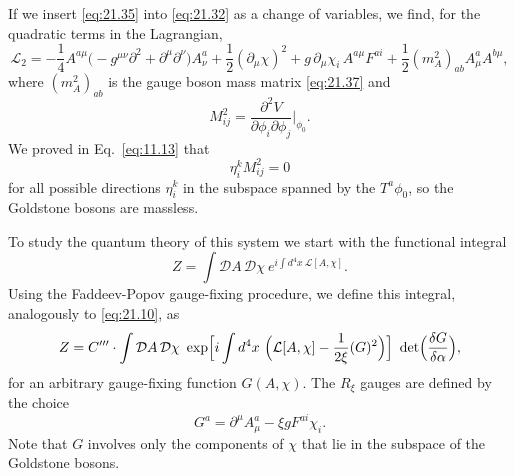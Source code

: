 If we insert \eqref{eq:21.35} into \eqref{eq:21.32} as a change of
variables, we find, for the quadratic terms in the Lagrangian,
\begin{equation}
  \mathcal{L}_2 = -\frac{1}{4}A^{a\mu}\bigl( -g^{\mu\nu}\partial^2
    + \partial^\mu\partial^\nu \bigr)A^a_\nu + \frac{1}{2}(\partial_\mu\chi)^2
    + g\,\partial_\mu\chi_i\,A^{a\mu}F^{ai}
    + \frac{1}{2}(m^2_A)_{ab}A^a_\mu A^{b\mu} ,
  \label{eq:21.40}
\end{equation}
where $(m^2_A)_{ab}$ is the gauge boson mass matrix \eqref{eq:21.37} and
\begin{equation}
  M^2_{ij} = \frac{\partial^2V}{\partial\phi_i\partial\phi_j}
    \Big|_{\phi_0} .
  \label{eq:21.41}
\end{equation}
We proved in Eq.~\eqref{eq:11.13} that
\begin{equation}
  \eta_i^k M^2_{ij} = 0
  \label{eq:21.42}
\end{equation}
for all possible directions $\eta_i^k$ in the subspace spanned by the
$T^a\phi_0$, so the Goldstone bosons are massless.

To study the quantum theory of this system we start with the functional
integral
\begin{equation}
  Z = \int \mathcal{D}A\,\mathcal{D}\chi\ e^{i\int d^4x\ \mathcal{L}[A,\chi]} .
  \label{eq:21.43}
\end{equation}
Using the Faddeev-Popov gauge-fixing procedure, we define this integral,
analogously to \eqref{eq:21.10}, as
\begin{equation}
  Z = C'''\cdot \int \mathcal{D}A\,\mathcal{D}\chi\ \exp\Bigl[ i\int d^4x\
    \Bigl( \mathcal{L}[A,\chi] - \frac{1}{2\xi}(G)^2 \Bigr) \Bigr]\
    \det\Bigl( \frac{\delta G}{\delta\alpha} \Bigr) ,
  \label{eq:21.44}
\end{equation}
for an arbitrary gauge-fixing function $G(A,\chi)$.  The $R_\xi$ gauges are
defined by the choice
\begin{equation}
  G^a = \partial^\mu A^a_\mu - \xi g F^{ai}\chi_i .
  \label{eq:21.45}
\end{equation}
Note that $G$ involves only the components of $\chi$ that lie in the
subspace of the Goldstone bosons.

